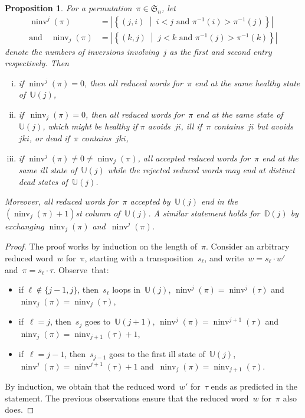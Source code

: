 \documentclass[11pt]{article}
\newtheorem{proposition}[theo]{Proposition}
\theoremstyle{definition}
\numberwithin{equation}{section}
\newcommand{\fS}{\mathfrak{S}}
\newcommand{\set}[2]{\left\{ #1 \;\middle|\; #2 \right\}}
\DeclareMathOperator{\ninv}{ninv}
\newcommand{\automatonU}{\mathbb{U}}
\newcommand{\automatonD}{\mathbb{D}}
\begin{document}
\begin{proposition}\label{prop:sameStateAcceptedReducedExpressionsRefined}
For a permutation~$\pi \in \fS_n$, let
\begin{align*}
\ninv^j(\pi) &= |\set{(j,i)}{i < j  \text{ and }  \pi^{-1}(i) > \pi^{-1}(j)}| \\
\text{and} \quad
\ninv_j(\pi) &= |\set{(k,j)}{j < k \text{ and } \pi^{-1}(j) > \pi^{-1}(k)}|
\end{align*}
denote the numbers of inversions involving~$j$ as the first and second entry respectively. Then
\begin{enumerate}[(i)]
	\item if $\ninv^j(\pi) = 0$, then all reduced words for~$\pi$ end at the same healthy state of~$\automatonU(j)$,
	\item if~$\ninv_j(\pi) = 0$, then all reduced words for~$\pi$ end at the same state of~$\automatonU(j)$, which might be healthy if $\pi$ avoids~$ji$, ill if~$\pi$ contains~$ji$ but avoids~$jki$, or dead if~$\pi$ contains~$jki$,
	\item if $\ninv^j(\pi) \ne 0 \ne \ninv_j(\pi)$, all accepted reduced words for~$\pi$ end at the same ill state of~$\automatonU(j)$ while the rejected reduced words may end at distinct dead states of~$\automatonU(j)$.
\end{enumerate}
Moreover, all reduced words for~$\pi$ accepted by~$\automatonU(j)$ end in the $(\ninv_j(\pi)+1)$st column of~$\automatonU(j)$.
A similar statement holds for~$\automatonD(j)$ by exchanging $\ninv_j(\pi)$ and~$\ninv^j(\pi)$.
\end{proposition}

\begin{proof}
The proof works by induction on the length of~$\pi$.
Consider an arbitrary reduced word~$w$ for~$\pi$, starting with a transposition~$s_\ell$, and write~$w = s_\ell \cdot w'$ and~$\pi = s_\ell \cdot \tau$.
Observe~that:
\begin{itemize}
	\item if $\ell \notin \{j-1, j\}$, then~$s_\ell$ loops in~$\automatonU(j)$, $\ninv^j(\pi) = \ninv^j(\tau)$ and $\ninv_j(\pi) = \ninv_j(\tau)$,
	\item if~$\ell = j$, then~$s_j$ goes to~$\automatonU(j+1)$, $\ninv^j(\pi) = \ninv^{j+1}(\tau)$ and~$\ninv_j(\pi) = \ninv_{j+1}(\tau) + 1$,
	\item if~$\ell = j-1$, then~$s_{j-1}$ goes to the first ill state of~$\automatonU(j)$, $\ninv^j(\pi) = {\ninv^{j+1}(\tau) + 1}$ and~$\ninv_j(\pi) = \ninv_{j+1}(\tau)$.
\end{itemize}
By induction, we obtain that the reduced word~$w'$ for~$\tau$ ends as predicted in the statement.
The previous observations ensure that the reduced word~$w$ for~$\pi$ also does.
\end{proof}
\end{document}
